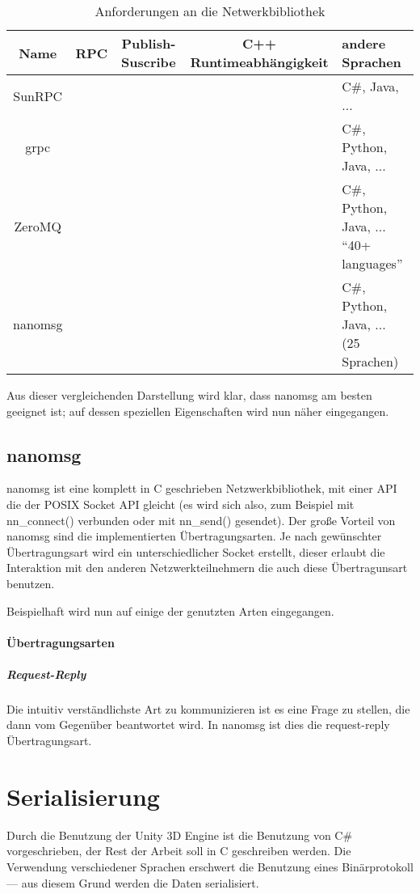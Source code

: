\clearpage %
\begin{table}[h]
\centering
\begin{tabu}{c | c | c | c | p{5cm}}
	\toprule
	Name & RPC & Publish-Suscribe & C++ Runtimeabh{\"{a}}ngigkeit & andere Sprachen \\
	\midrule
	SunRPC & \checkmark & \xmark & \checkmark & C\#, Java, ... \\
	grpc\cite{grpc} & \checkmark & \xmark & \xmark & C\#, Python, Java, ... \\
	ZeroMQ\cite{zeromq} & \xmark & \checkmark & \xmark & C\#, Python, Java, ... \enquote{40+ languages} \\
	nanomsg\cite{nanomsg} & \xmark & \checkmark & \checkmark & C\#, Python, Java, ... (25 Sprachen) \\
	\bottomrule
\end{tabu}
\caption{Anforderungen an die Netwerkbibliothek}
\end{table}

Aus dieser vergleichenden Darstellung wird klar, dass nanomsg am besten geeignet ist; auf dessen speziellen Eigenschaften wird nun n{\"{a}}her eingegangen.

\subsection{nanomsg}
nanomsg ist eine komplett in C geschrieben Netzwerkbibliothek, mit einer API die der POSIX Socket API gleicht (es wird sich also, zum Beispiel mit nn\_connect() verbunden oder mit nn\_send() gesendet).
Der gro{\ss}e Vorteil von nanomsg sind die implementierten {\"{U}}bertragungsarten. Je nach gew{\"{u}}nschter {\"{U}}bertragungsart wird ein unterschiedlicher Socket erstellt, dieser erlaubt die
Interaktion mit den anderen Netzwerkteilnehmern die auch diese {\"{U}}bertragunsart benutzen.

Beispielhaft wird nun auf einige der genutzten Arten eingegangen.

\paragraph{{\"{U}}bertragungsarten}
\subparagraph{Request-Reply} Die intuitiv verst{\"{a}}ndlichste Art zu kommunizieren ist es eine Frage zu stellen, die dann vom Gegen{\"{u}}ber beantwortet wird. In nanomsg ist dies die request-reply
{\"{U}}bertragungsart.

\clearpage
\section{Serialisierung}
Durch die Benutzung der Unity 3D Engine ist die Benutzung von C\# vorgeschrieben, der Rest der Arbeit soll in C geschreiben werden. Die Verwendung verschiedener Sprachen erschwert die Benutzung eines
Bin{\"{a}}rprotokoll --- aus diesem Grund werden die Daten serialisiert.

